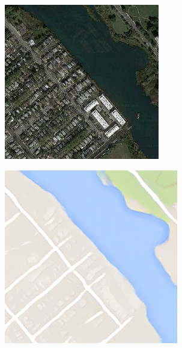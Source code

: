 \begin{figure}
	\medskip

	\begin{subfigure}[t]{.2\textwidth}
		\centering
		\includegraphics[width=\linewidth]{images/Vergleich/Satelite17.jpg}
	  \end{subfigure}
	  \begin{subfigure}[t]{.2\textwidth}
		\centering
		\includegraphics[width=\linewidth]{images/Vergleich/p11.png}

\end{subfigure}
\end{figure}
